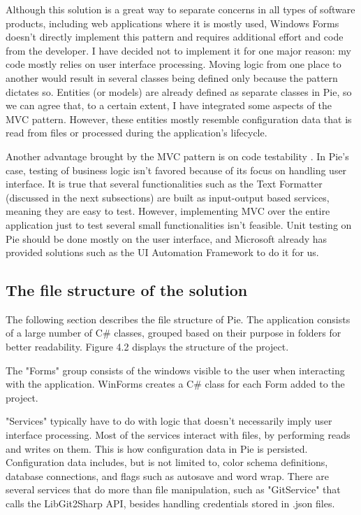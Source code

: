 Although this solution is a great way to separate concerns in all types of software products, including web applications where it is mostly used, Windows Forms doesn't directly implement this pattern and requires additional effort and code from the developer. I have decided not to implement it for one major reason: my code mostly relies on user interface processing. Moving logic from one place to another would result in several classes being defined only because the pattern dictates so. Entities (or models) are already defined as separate classes in Pie, so we can agree that, to a certain extent, I have integrated some aspects of the MVC pattern. However, these entities mostly resemble configuration data that is read from files or processed during the application's lifecycle.

Another advantage brought by the MVC pattern is on code testability \cite{mvc-testability}. In Pie's case, testing of business logic isn't favored because of its focus on handling user interface. It is true that several functionalities such as the Text Formatter (discussed in the next subsections) are built as input-output based services, meaning they are easy to test. However, implementing MVC over the entire application just to test several small functionalities isn't feasible. Unit testing on Pie should be done mostly on the user interface, and Microsoft already has provided solutions such as the UI Automation Framework \cite{ui-automation-framework} to do it for us.

\subsection{The file structure of the solution}

The following section describes the file structure of Pie. The application consists of a large number of C\# classes, grouped based on their purpose in folders for better readability. Figure 4.2 displays the structure of the project.

The "Forms" group consists of the windows visible to the user when interacting with the application. WinForms creates a C\# class for each Form added to the project.

"Services" typically have to do with logic that doesn't necessarily imply user interface processing. Most of the services interact with files, by performing reads and writes on them. This is how configuration data in Pie is persisted. Configuration data includes, but is not limited to, color schema definitions, database connections, and flags such as autosave and word wrap. There are several services that do more than file manipulation, such as "GitService" that calls the LibGit2Sharp API, besides handling credentials stored in .json files.

